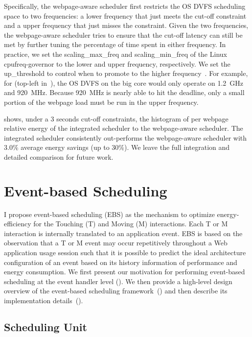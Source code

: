 Specifically, the webpage-aware scheduler first restricts the OS DVFS scheduling space to two frequencies: a lower frequency that just meets the cut-off constraint and a upper frequency that just misses the constraint. Given the two frequencies, the webpage-aware scheduler tries to ensure that the cut-off latency can still be met by further tuning the percentage of time spent in either frequency. In practice, we set the \textsf{scaling\_max\_freq} and \textsf{scaling\_min\_freq} of the Linux cpufreq-governor to the lower and upper frequency, respectively. We set the \textsf{up\_threshold} to control when to promote to the higher frequency~\cite{ondemand}. For example, for  (top-left in~), the OS DVFS on the big core would only operate on 1.2~GHz and 920~MHz. Because 920~MHz is nearly able to hit the deadline, only a small portion of the webpage load must be run in the upper frequency.  

 shows, under a 3 seconds cut-off constraints, the histogram of per webpage relative energy of the integrated scheduler to the webpage-aware scheduler.  The integrated scheduler consistently out-performs the webpage-aware scheduler with 3.0\% average energy savings (up to 30\%).  We leave the full integration and detailed comparison for future work.

\section{Event-based Scheduling}
\label{sec:runtime:ebs}

I propose event-based scheduling (EBS) as the mechanism to optimize energy-efficiency for the Touching (T) and Moving (M) interactions. Each T or M interaction is internally translated to an application event. EBS is based on the observation that a T or M event may occur repetitively throughout a Web application usage session such that it is possible to predict the ideal architecture configuration of an event based on its history information of performance and energy consumption. We first present our motivation for performing event-based scheduling at the event handler level (). We then provide a high-level design overview of the event-based scheduling framework~() and then describe its implementation details~().

\subsection{Scheduling Unit}
\label{sec:runtime:ebs:char}

